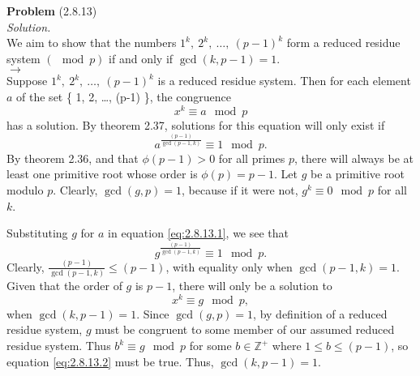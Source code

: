 \documentclass[12 pt]{amsart}
\begin{document}
\phantom{\quad} \vfill
\noindent
\textbf{Problem} (2.8.13) \\[4ex]
\emph{Solution.} \\[2ex]
  We aim to show that the numbers
  $1^k,\ 2^k,\ \ldots,\ (p-1)^k$ form a reduced residue system
  $(\mod p)$ if and only if $\gcd(k, p-1) = 1$.  \\

  \noindent
  $\longrightarrow$ \\
  Suppose
  $1^k,\ 2^k,\ \ldots,\ (p-1)^k$ is a reduced residue system.
  Then for each element $a$ of the set
  \{ 1, 2, \ldots, (p-1) \}, 
  the congruence
  \[
    x^k \equiv a \mod p
  \]
  has a solution.
  By theorem 2.37, solutions for this equation 
  will only exist if 
  \begin{equation}
    \label{eq:2.8.13.1}
    a^{\frac{(p-1)}{\gcd(p-1, k)}} \equiv 1 \mod p.
  \end{equation}
  By theorem 2.36, and that $\phi(p-1) > 0$ for all
  primes $p$, there will always be at least one primitive
  root whose order is $\phi(p) = p-1$. 
  Let $g$ be a primitive root modulo $p$.
  Clearly, $\gcd(g, p) = 1$, because if it were not,
  $g^k \equiv 0 \mod p$ for all $k$.
  
  Substituting $g$ for $a$ in equation \ref{eq:2.8.13.1}, we see that
  \begin{equation}
    \label{eq:2.8.13.2}
    g^{\frac{(p-1)}{\gcd(p-1, k)}} \equiv 1 \mod p.
  \end{equation}
  Clearly, 
  $\frac{(p-1)}{\gcd(p-1, k)} \leq (p-1)$, with equality
  only when $\gcd(p-1,k) = 1$. 
  Given that the order of $g$ is $p-1$, there will
  only be a solution to 
  \[
    x^k \equiv g \mod p,
  \]
  when $\gcd(k, p-1) = 1$. 
  Since $\gcd(g, p) = 1$, by definition of a reduced
  residue system, $g$ must be congruent to some member
  of our assumed reduced residue system.
  Thus $b^k \equiv g \mod p$ for some $b \in \mathbb{Z}^+$ where
  $1 \leq b \leq (p-1)$, so equation \ref{eq:2.8.13.2} must be true.
  Thus, $\gcd(k, p-1) = 1$.  \\
\end{document}
